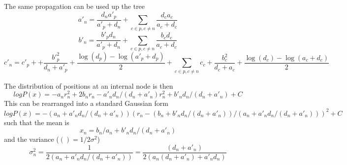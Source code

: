 \documentclass[aps,rmp, onecolumn]{revtex4}
\begin{document}
The same propagation can be used up the tree
\begin{equation}
    a'_n  =  \frac{d_n a'_p}{a'_p+d_n} + \sum_{c\in p, c\neq n} \frac{d_c a_c}{a_c+d_c}
\end{equation}
\begin{equation}
    b'_n = \frac{b'_p d_n}{a'_p + d_n} + \sum_{c\in p, c\neq n}\frac{b_c d_c}{a_c + d_c}
\end{equation}
\begin{equation}
    c'_n = c'_p + + \frac{b'_p^2}{d_n + a'_p} + \frac{\log(d_p) - \log(a'_p+d_p)}{2} +  \sum_{c\in p, c\neq n} c_c  + \frac{b_c^2}{d_c + a_c} + \frac{\log(d_c) - \log(a_c+d_c)}{2}
\end{equation}

The distribution of positions at an internal node is then
\begin{equation}
    log P(x) = -a_n r_n^2 + 2 b_n r_n - a'_n d_n/(d_n + a'_n) r_n^2 + b'_n d_n/(d_n + a'_n) + C
\end{equation}
This can be rearranged into a standard Gaussian form
\begin{equation}
    log P(x) = -(a_n + a'_n d_n/(d_n + a'_n)) (r_n - (b_n + b'_n d_n/(d_n + a'_n))/(a_n + a'_n d_n/(d_n + a'_n)))^2 + C
\end{equation}
such that the mean is
\begin{equation}
    x_n = b_n/a_n + b'_n d_n/(d_n + a'_n)
\end{equation}
and the variance ($() = 1/2\sigma^2$)
\begin{equation}
    \sigma^2_n = \frac{1}{2(a_n + a'_n d_n/(d_n + a'_n))} = \frac{(d_n + a'_n)}{2(a_n(d_n + a'_n) + a'_n d_n)}
\end{equation}
\end{document}
